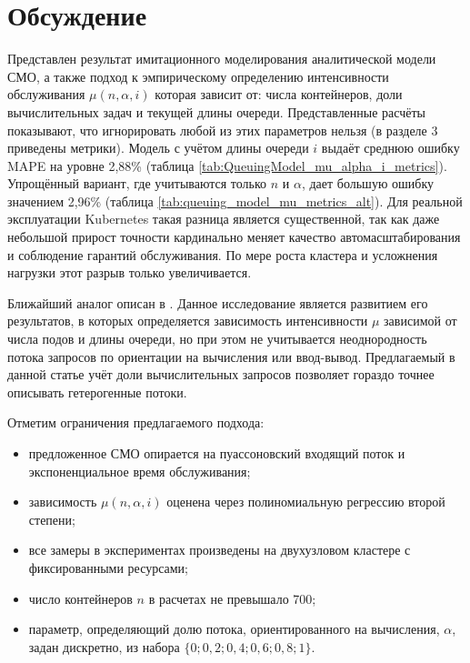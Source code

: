 \documentclass[12pt,a4paper]{article}
\begin{document}
\section{Обсуждение}
\label{sec:discussion}

Представлен результат имитационного моделирования аналитической модели СМО, а также подход к эмпирическому определению интенсивности обслуживания $\mu(n, \alpha, i)$ которая зависит от: числа контейнеров, доли вычислительных задач и текущей длины очереди. Представленные расчёты показывают, что игнорировать любой из этих параметров нельзя (в разделе 3 приведены метрики). Модель с учётом длины очереди $i$ выдаёт среднюю ошибку MAPE на уровне 2,88\% (таблица \ref{tab:QueuingModel_mu_alpha_i_metrics}). Упрощённый вариант, где учитываются только $n$ и $\alpha$, дает большую ошибку значением 2,96\% (таблица \ref{tab:queuing_model_mu_metrics_alt}). Для реальной эксплуатации Kubernetes такая разница является существенной, так как даже небольшой прирост точности кардинально меняет качество автомасштабирования и соблюдение гарантий обслуживания. По мере роста кластера и усложнения нагрузки этот разрыв только увеличивается.

Ближайший аналог описан в \cite{фунг2024оценка}.
Данное исследование является развитием его результатов, в которых определяется зависимость интенсивности $\mu$ зависимой от числа подов и длины очереди, но при этом не учитывается неоднородность потока запросов по ориентации на вычисления или ввод-вывод. Предлагаемый в данной статье учёт доли вычислительных запросов позволяет гораздо точнее описывать гетерогенные потоки.

Отметим ограничения предлагаемого подхода:
\begin{itemize}
  \item предложенное СМО опирается на пуассоновский входящий поток и экспоненциальное время обслуживания;
  \item зависимость $\mu(n,\alpha,i)$ оценена через полиномиальную регрессию второй степени;
  \item все замеры в экспериментах произведены на двухузловом кластере с фиксированными ресурсами;
  \item число контейнеров $n$ в расчетах не превышало 700;
  \item параметр, определяющий долю потока, ориентированного на вычисления, $\alpha$, задан дискретно, из набора $\{0; 0,2; 0,4; 0,6; 0,8; 1\}$.
\end{itemize}
\end{document}
